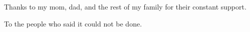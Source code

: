 \noindent
Thanks to my mom, dad, and the rest of my family for their constant support. 

\medskip

\noindent
To the people who said it could not be done.

\medskip